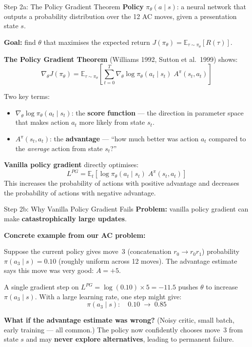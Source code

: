 \documentclass[aspectratio=169,11pt]{beamer}
\begin{document}
\begin{frame}{Step 2a: The Policy Gradient Theorem}
  \small
  \textbf{Policy} $\pi_\theta(a \mid s)$: a neural network that outputs a probability distribution
  over the 12 AC moves, given a presentation state $s$.

  \medskip
  \textbf{Goal:} find $\theta$ that maximises the expected return $J(\pi_\theta) = \mathbb{E}_{\tau \sim \pi_\theta}[R(\tau)]$.

  \medskip
  \textbf{The Policy Gradient Theorem} (Williams 1992, Sutton et al.\ 1999) shows:
  \[
    \nabla_\theta J(\pi_\theta) = \mathbb{E}_{\tau \sim \pi_\theta}\!\left[
      \sum_{t=0}^{T} \nabla_\theta \log \pi_\theta(a_t \mid s_t)\; A^{\pi}(s_t, a_t)
    \right]
  \]

  Two key terms:
  \begin{itemize}\setlength\itemsep{2pt}
    \item $\nabla_\theta \log \pi_\theta(a_t \mid s_t)$: the \textbf{score function} ---
      the direction in parameter space that makes action $a_t$ more likely from state $s_t$.
    \item $A^{\pi}(s_t, a_t)$: the \textbf{advantage} --- ``how much better was action $a_t$
      compared to the \emph{average} action from state $s_t$?''
  \end{itemize}

  \medskip
  \textbf{Vanilla policy gradient} directly optimises:
  \[
    L^{PG} = \mathbb{E}_t\!\left[
      \log \pi_\theta(a_t \mid s_t)\; A^{\pi}(s_t, a_t)
    \right]
  \]
  This increases the probability of actions with positive advantage and decreases
  the probability of actions with negative advantage.
\end{frame}

\begin{frame}{Step 2b: Why Vanilla Policy Gradient Fails}
  \small
  \textbf{Problem:} vanilla policy gradient can make \textbf{catastrophically large updates}.

  \medskip
  \textbf{Concrete example from our AC problem:}

  \smallskip
  Suppose the current policy gives move~3 (concatenation $r_0 \to r_0 r_1$)
  probability $\pi(a_3 \mid s) = 0.10$ (roughly uniform across 12 moves).
  The advantage estimate says this move was very good: $A = +5$.

  \medskip
  A single gradient step on $L^{PG} = \log(0.10) \times 5 = -11.5$ pushes $\theta$
  to increase $\pi(a_3 \mid s)$. With a large learning rate, one step might give:
  \[
    \pi(a_3 \mid s): \quad 0.10 \;\to\; 0.85
  \]

  \textbf{What if the advantage estimate was wrong?}
  (Noisy critic, small batch, early training --- all common.)
  The policy now confidently chooses move~3 from state $s$
  and may \textbf{never explore alternatives}, leading to permanent failure.
\end{frame}
\end{document}

